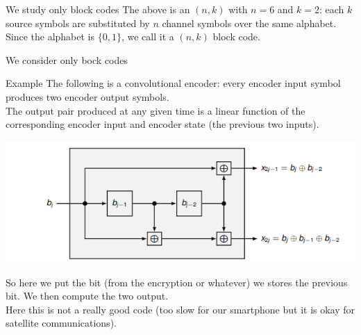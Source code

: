 \begin{parag}{We study only block codes}
    The above is an $\left(n, k\right)$  with $n= 6$ and $k =  2$: each $k$ source symbols are substituted by $n$ channel symbols over the same alphabet.\\
    Since the alphabet is $\{0, 1\}$, we call it a  $\left(n, k\right)$ block code.

    \begin{framedremark}
        We consider only bock codes
    \end{framedremark}
    
    
\end{parag}

\begin{parag}{Example}
    The following is a convolutional encoder: every encoder input symbol produces two encoder output symbols.\\
    The output pair produced at any given time is a linear function of the corresponding encoder input and encoder state (the previous two inputs).
    \begin{center}
        \includegraphics[scale=0.9]{42025-04-29.png}
    \end{center}
        So here we put the bit (from the encryption or whatever) we stores the previous bit. We then compute the two output.\\
        Here this is not a really good code (too slow for our smartphone but it is okay for satellite communications).

    
\end{parag}
